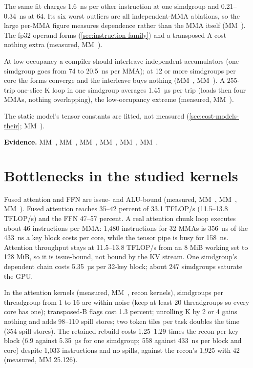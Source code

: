 The same fit charges 1.6~ns per other instruction at one simdgroup and 0.21–0.34~ns at 64. Its six worst outliers are
all independent-MMA ablations, so the large per-MMA figure measures dependence rather than the MMA itself (MM~). The
fp32-operand forms (\cref{sec:instruction-family}) and a transposed A cost nothing extra (measured, MM~).

At low occupancy a compiler should interleave independent accumulators (one simdgroup goes from 74 to 20.5~ns
per MMA); at 12 or more simdgroups per core the forms converge and the interleave buys nothing (MM~, MM~). A
255-trip one-slice K loop in one simdgroup averages 1.45~µs per trip (loads then four MMAs, nothing overlapping), the
low-occupancy extreme (measured, MM~).

The static model's tensor constants are fitted, not measured (\cref{sec:cost-models-their}; MM~).

\textbf{Evidence.} MM~, MM~, MM~, MM~, MM~, MM~.

\section{Bottlenecks in the studied kernels}\label{sec:measured-bottlenecks-studied}

Fused attention and FFN are issue- and ALU-bound (measured, MM~, MM~, MM~). Fused attention reaches 35–42
percent of 33.1 TFLOP/s (11.5–13.8 TFLOP/s) and the FFN 47–57 percent. A real attention chunk loop executes about
46 instructions per MMA: 1,480 instructions for 32 MMAs is 356~ns of the 433~ns a key block costs per core, while
the tensor pipe is busy for 158~ns. Attention throughput stays at 11.5–13.8 TFLOP/s from an 8 MiB working set to 128
MiB, so it is issue-bound, not bound by the KV stream. One simdgroup's dependent chain costs
5.35~µs per 32-key block; about 247 simdgroups saturate the GPU.

In the attention kernels (measured, MM~, recon kernels), simdgroups per threadgroup from 1 to 16
are within noise (keep at least 20 threadgroups so every core has one); transposed-B flags cost 1.3 percent; unrolling
K by 2 or 4 gains nothing and adds 98–110 spill stores; two token tiles per task doubles the time (354 spill stores).
The retained rebuild costs 1.25–1.29 times the recon per key block (6.9 against 5.35~µs for one simdgroup; 558 against
433~ns per block and core) despite 1,033 instructions and no spills, against the recon's 1,925 with 42 (measured, MM
25.126).


